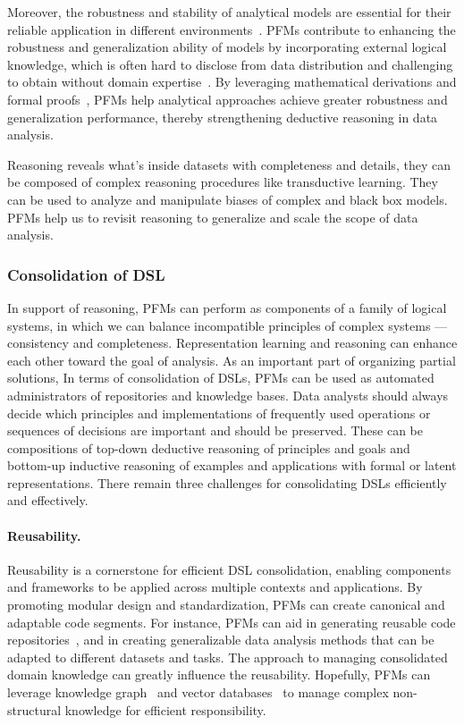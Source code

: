   Moreover, the robustness and stability of analytical models are essential for their reliable application in different environments~\cite{029dietterich1995overfitting}. PFMs contribute to enhancing the robustness and generalization ability of models by incorporating external logical knowledge, which is often hard to disclose from data distribution and challenging to obtain without domain expertise~\cite{031guyon2003introduction}. By leveraging mathematical derivations and formal proofs~\cite{wang2023large}, PFMs help analytical approaches achieve greater robustness and generalization performance, thereby strengthening deductive reasoning in data analysis.
  
  Reasoning reveals what's inside datasets with completeness and details, they can be composed of complex reasoning procedures like transductive learning. They can be used to analyze and manipulate biases of complex and black box models. PFMs help us to revisit reasoning to generalize and scale the scope of data analysis.
  
  \subsubsection{Consolidation of DSL}\label{sec:consolidate_dsl}
  
  In support of reasoning, PFMs can perform as components of a family of logical systems, in which we can balance incompatible principles of complex systems — consistency and completeness. Representation learning and reasoning can enhance each other toward the goal of analysis. As an important part of organizing partial solutions, In terms of consolidation of DSLs, PFMs can be used as automated administrators of repositories and knowledge bases. Data analysts should always decide which principles and implementations of frequently used operations or sequences of decisions are important and should be preserved. These can be compositions of top-down deductive reasoning of principles and goals and bottom-up inductive reasoning of examples and applications with formal or latent representations. There remain three challenges for consolidating DSLs efficiently and effectively.
  
  \paragraph{Reusability.} Reusability is a cornerstone for efficient DSL consolidation, enabling components and frameworks to be applied across multiple contexts and applications. By promoting modular design and standardization, PFMs can create canonical and adaptable code segments. For instance, PFMs can aid in generating reusable code repositories~\cite{jain2024r2e, repocomp}, and in creating generalizable data analysis methods that can be adapted to different datasets and tasks. The approach to managing consolidated domain knowledge can greatly influence the reusability. Hopefully, PFMs can leverage knowledge graph~\cite{constructKG,KGobjectrecognition} and vector databases~\cite{vectorstorage} to manage complex non-structural knowledge for efficient responsibility.
  
